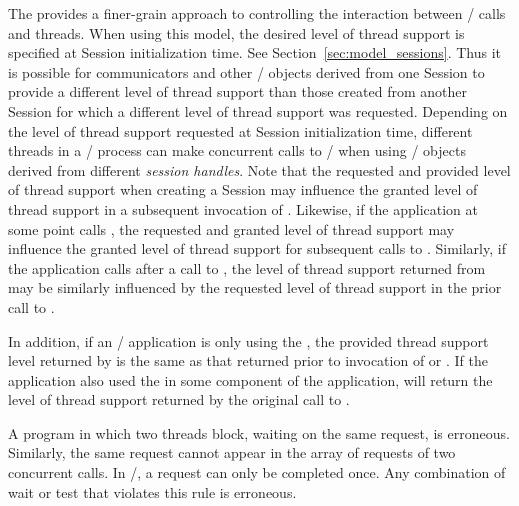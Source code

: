 The \spm{}\mpitermindex{\spm} provides a finer-grain approach to controlling the interaction
between \MPI/ calls and threads.  When using this model,
the desired level of thread support is specified at Session initialization time.  See Section~\ref{sec:model_sessions}.
Thus it is possible for communicators and other \MPI/ objects derived from one Session to provide a different level of thread
support than those created from another Session for which a different level of thread support was requested.
Depending on the level of thread support requested at Session initialization time, different threads in a \MPI/ process can make
concurrent calls to \MPI/ when using \MPI/ objects derived from different \emph{session handles}.
Note that the requested and provided level of thread support when creating a Session may influence the
granted level of thread support in a subsequent invocation of .  Likewise,
if the application at some point calls , the requested and granted level
of thread support may influence the granted level of thread support for subsequent calls to .
Similarly, if the application calls  after a call to ,
the level of thread support returned from  may be similarly influenced by the
requested level of thread support in the prior call to .

In addition, if an \MPI/ application is only using the \spm{}, the provided
thread support level returned by  is the same as that returned prior to invocation of
 or .  If the application also used
the \wpm{} in some component of the application,  will
return the level of thread support returned by the original call to .

A program in which two threads block, waiting on the same
request, is erroneous.  Similarly, the same request cannot appear in
the array of requests of two concurrent
%
%
%
%
%
%
calls.
In \mpi/, a request can only be completed once.  Any combination of
wait or test that violates this rule is erroneous.


